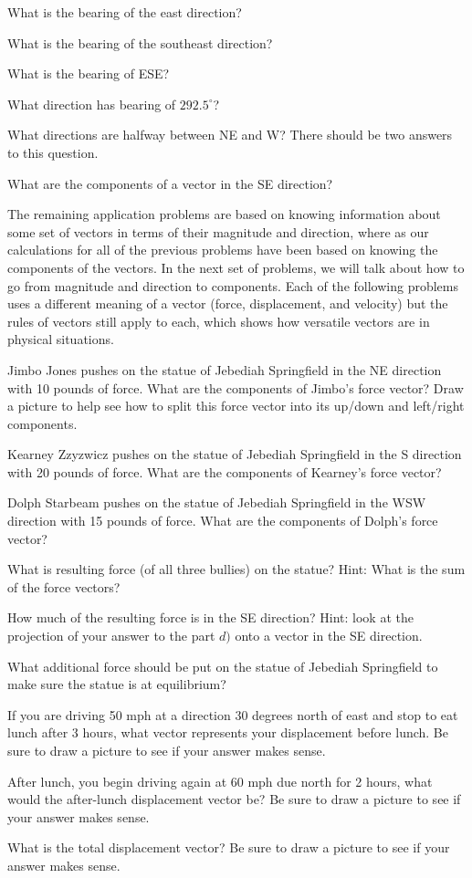 \bq \be
\item What is the bearing of the east direction?
\item What is the bearing of the southeast direction?
\item What is the bearing of ESE?
\item What direction has bearing of $292.5^\circ$?
\item What directions are halfway between NE and W? There should be two answers to this question.
\item What are the components of a vector in the SE direction?
\ee \eq

The remaining application problems are based on knowing information about some set of vectors in terms of their magnitude and direction, where as our calculations for all of the previous problems have been based on knowing the components of the vectors. In the next set of problems, we will talk about how to go from magnitude and direction to components. Each of the following problems uses a different meaning of a vector (force, displacement, and velocity) but the rules of vectors still apply to each, which shows how versatile vectors are in physical situations.

\bq \be
\item Jimbo Jones pushes on the statue of Jebediah Springfield in the NE direction with 10 pounds of force. What are the components of Jimbo's force vector? Draw a picture to help see how to split this force vector into its up/down and left/right components.
\item Kearney Zzyzwicz pushes on the statue of Jebediah Springfield in the S direction with 20 pounds of force. What are the components of Kearney's force vector?
\item Dolph Starbeam pushes on the statue of Jebediah Springfield in the WSW direction with 15 pounds of force. What are the components of Dolph's force vector?
\item What is resulting force (of all three bullies) on the statue? Hint: What is the sum of the force vectors?
\item How much of the resulting force is in the SE direction? Hint: look at the projection of your answer to the part $d)$ onto a vector in the SE direction.
\item What additional force should be put on the statue of Jebediah Springfield to make sure the statue is at equilibrium?
\ee
\eq

\bq \be
\item If you are driving 50 mph at a direction 30 degrees north of east and stop to eat lunch after 3 hours, what vector represents your displacement before lunch. Be sure to draw a picture to see if your answer makes sense.
\item After lunch, you begin driving again at 60 mph due north for 2 hours, what would the after-lunch displacement vector be? Be sure to draw a picture to see if your answer makes sense.
\item What is the total displacement vector? Be sure to draw a picture to see if your answer makes sense.
\ee
\eq

